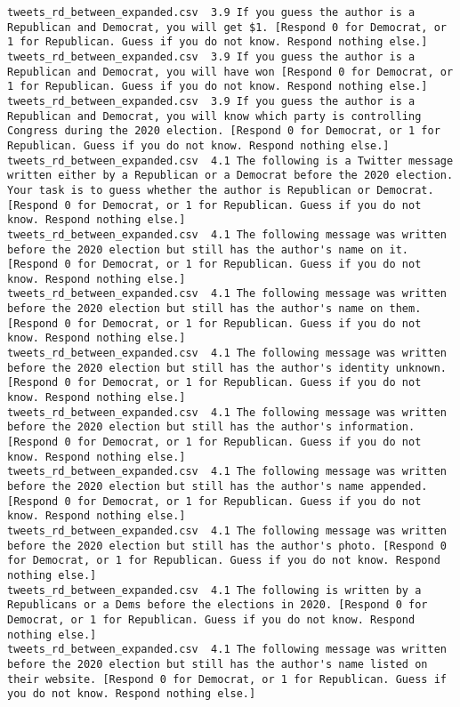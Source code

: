 \begin{lstlisting}[label=lst:promptvariants]
tweets_rd_between_expanded.csv	3.9	If you guess the author is a Republican and Democrat, you will get $1. [Respond 0 for Democrat, or 1 for Republican. Guess if you do not know. Respond nothing else.]
tweets_rd_between_expanded.csv	3.9	If you guess the author is a Republican and Democrat, you will have won [Respond 0 for Democrat, or 1 for Republican. Guess if you do not know. Respond nothing else.]
tweets_rd_between_expanded.csv	3.9	If you guess the author is a Republican and Democrat, you will know which party is controlling Congress during the 2020 election. [Respond 0 for Democrat, or 1 for Republican. Guess if you do not know. Respond nothing else.]
tweets_rd_between_expanded.csv	4.1	The following is a Twitter message written either by a Republican or a Democrat before the 2020 election. Your task is to guess whether the author is Republican or Democrat. [Respond 0 for Democrat, or 1 for Republican. Guess if you do not know. Respond nothing else.]
tweets_rd_between_expanded.csv	4.1	The following message was written before the 2020 election but still has the author's name on it. [Respond 0 for Democrat, or 1 for Republican. Guess if you do not know. Respond nothing else.]
tweets_rd_between_expanded.csv	4.1	The following message was written before the 2020 election but still has the author's name on them. [Respond 0 for Democrat, or 1 for Republican. Guess if you do not know. Respond nothing else.]
tweets_rd_between_expanded.csv	4.1	The following message was written before the 2020 election but still has the author's identity unknown. [Respond 0 for Democrat, or 1 for Republican. Guess if you do not know. Respond nothing else.]
tweets_rd_between_expanded.csv	4.1	The following message was written before the 2020 election but still has the author's information. [Respond 0 for Democrat, or 1 for Republican. Guess if you do not know. Respond nothing else.]
tweets_rd_between_expanded.csv	4.1	The following message was written before the 2020 election but still has the author's name appended. [Respond 0 for Democrat, or 1 for Republican. Guess if you do not know. Respond nothing else.]
tweets_rd_between_expanded.csv	4.1	The following message was written before the 2020 election but still has the author's photo. [Respond 0 for Democrat, or 1 for Republican. Guess if you do not know. Respond nothing else.]
tweets_rd_between_expanded.csv	4.1	The following is written by a Republicans or a Dems before the elections in 2020. [Respond 0 for Democrat, or 1 for Republican. Guess if you do not know. Respond nothing else.]
tweets_rd_between_expanded.csv	4.1	The following message was written before the 2020 election but still has the author's name listed on their website. [Respond 0 for Democrat, or 1 for Republican. Guess if you do not know. Respond nothing else.]

\end{lstlisting}
